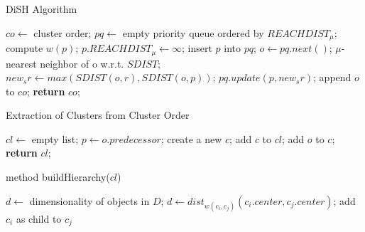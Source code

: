 \documentclass{article}
\begin{document}
\begin{algorithm}
\caption{DiSH Algorithm}
\begin{algorithmic}[1]
    \State $co\leftarrow$ cluster order; 
    \State $pq\leftarrow$ empty priority queue ordered by $REACHDIST_{\mu};$
        \State compute $w(p)$;
        \State $p.REACHDIST_{\mu} \leftarrow \infty$;
        \State insert $p$ into $pq$;
    \EndFor
        \State $o\leftarrow pq.next()$;
        \State $\mu$-nearest neighbor of o w.r.t. $SDIST$;
            \State $new_sr\leftarrow max(SDIST(o,r), SDIST(o,p))$;
            \State $pq.update(p, new_sr)$;
        \EndFor%
        \State append $o$ to $co$;
    \EndWhile%
    \State\textbf{return} $co$;
\EndProcedure
\end{algorithmic}
\end{algorithm}

\begin{algorithm}
\caption{Extraction of Clusters from Cluster Order}
\begin{algorithmic}[1]
    \State $cl \leftarrow$ empty list; 
        \State $p\leftarrow o.predecessor$;
            \State create a new $c$;
            \State add $c$ to $cl$;
        \EndIf
        \State add $o$ to $c$;
    \EndFor
    \State\textbf{return} $cl$;
\EndProcedure
\end{algorithmic}
\end{algorithm}

\begin{algorithm}
\caption{method buildHierarchy($cl$)}
\begin{algorithmic}
    \State $d\leftarrow$ dimensionality of objects in $D$;
                \State $d\leftarrow dist_{w(c_{i},c_{j})}(c_{i}.center,c_{j}.center)$;
                    \State add $c_{i}$ as child to $c_{j}$
                \EndIf
            \EndIf
        \EndFor
    \EndFor
\EndProcedure
\end{algorithmic}
\end{algorithm}
\end{document}
